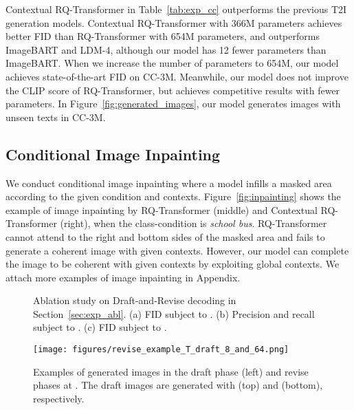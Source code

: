 \documentclass{article}
\newcommand{\ARmodel}{Contextual RQ-Transformer }
\begin{document}
\ARmodel in Table~\ref{tab:exp_cc} outperforms the previous T2I generation models.
\ARmodel with 366M parameters achieves better FID than RQ-Transformer with 654M parameters, and outperforms ImageBART and LDM-4, although our model has 12 fewer parameters than ImageBART.
When we increase the number of parameters to 654M, our model achieves state-of-the-art FID on CC-3M.
Meanwhile, our model does not improve the CLIP score of RQ-Transformer, but achieves competitive results with fewer parameters.
In Figure~\ref{fig:generated_images}, our model generates images with unseen texts in CC-3M.



\subsection{Conditional Image Inpainting} \label{sec:exp_manipulation}
We conduct conditional image inpainting where a model infills a masked area according to the given condition and contexts.
Figure~\ref{fig:inpainting} shows the example of image inpainting by RQ-Transformer (middle) and \ARmodel (right), when the class-condition is \emph{school bus}.
RQ-Transformer cannot attend to the right and bottom sides of the masked area and fails to generate a coherent image with given contexts. 
However, our model can complete the image to be coherent with given contexts by exploiting global contexts.
We attach more examples of image inpainting in Appendix.




\begin{figure}
\centering
{}
\hspace{4pt}
\hspace{3.5pt}
\caption{Ablation study on Draft-and-Revise decoding in Section~\ref{sec:exp_abl}. (a) FID subject to . (b) Precision and recall subject to . (c) FID subject to . }
\label{fig:exp_abl}
\end{figure}

\begin{figure}
\centering
\texttt{[image: figures/revise\_example\_T\_draft\_8\_and\_64.png]}
\caption{Examples of generated images in the draft phase (left) and revise phases at . The draft images are generated with  (top) and  (bottom), respectively.}
\label{fig:exp_revise_example}
\end{figure}
\end{document}
